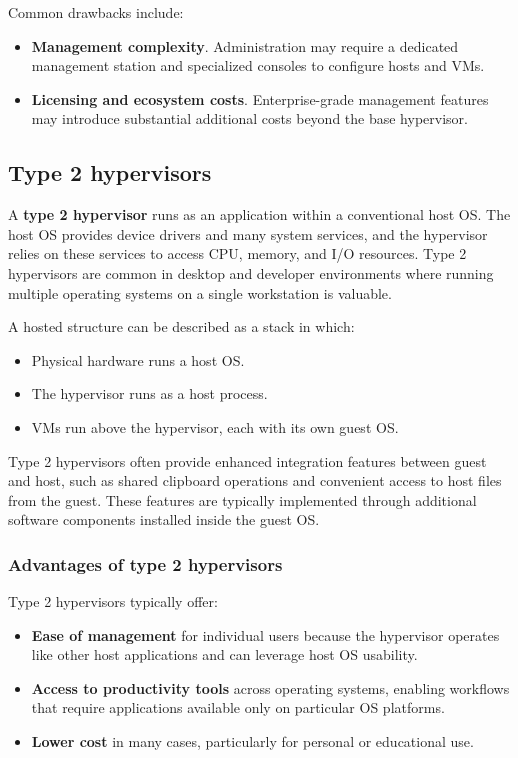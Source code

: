 \documentclass[11pt,a4paper,openany]{report}
\begin{document}
Common drawbacks include:

\begin{itemize}
\item \textbf{Management complexity}. Administration may require a dedicated management station and specialized consoles to configure hosts and VMs.
\item \textbf{Licensing and ecosystem costs}. Enterprise-grade management features may introduce substantial additional costs beyond the base hypervisor.
\end{itemize}

\subsection{Type 2 hypervisors}

A \textbf{type 2 hypervisor} runs as an application within a conventional host OS. The host OS provides device drivers and many system services, and the hypervisor relies on these services to access CPU, memory, and I/O resources. Type 2 hypervisors are common in desktop and developer environments where running multiple operating systems on a single workstation is valuable.

A hosted structure can be described as a stack in which:

\begin{itemize}
\item Physical hardware runs a host OS.
\item The hypervisor runs as a host process.
\item VMs run above the hypervisor, each with its own guest OS.
\end{itemize}

Type 2 hypervisors often provide enhanced integration features between guest and host, such as shared clipboard operations and convenient access to host files from the guest. These features are typically implemented through additional software components installed inside the guest OS.

\subsubsection*{Advantages of type 2 hypervisors}

Type 2 hypervisors typically offer:

\begin{itemize}
\item \textbf{Ease of management} for individual users because the hypervisor operates like other host applications and can leverage host OS usability.
\item \textbf{Access to productivity tools} across operating systems, enabling workflows that require applications available only on particular OS platforms.
\item \textbf{Lower cost} in many cases, particularly for personal or educational use.
\end{itemize}
\end{document}
